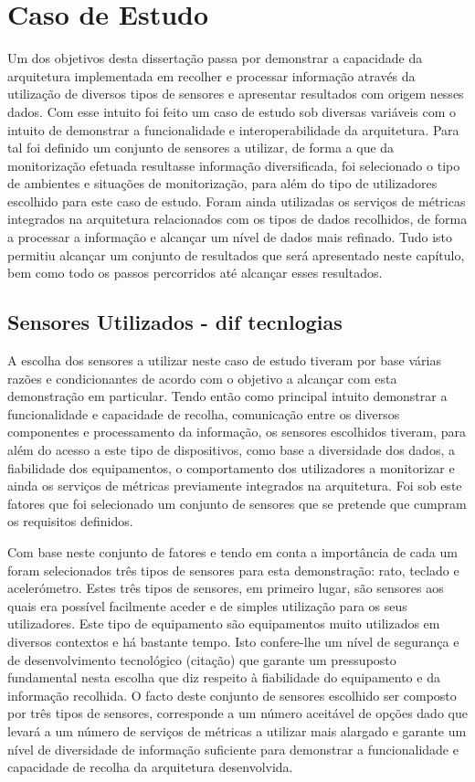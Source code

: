 \chapter{Caso de Estudo}

Um dos objetivos desta dissertação passa por demonstrar a capacidade da arquitetura implementada em recolher e processar informação através da utilização de diversos tipos de sensores e apresentar resultados com origem nesses dados. Com esse intuito foi feito um caso de estudo sob diversas variáveis com o intuito de demonstrar a funcionalidade e interoperabilidade da arquitetura. Para tal foi definido um conjunto de sensores a utilizar, de forma a que da monitorização efetuada resultasse informação diversificada, foi selecionado o tipo de ambientes e situações de monitorização, para além do tipo de utilizadores escolhido para este caso de estudo. Foram ainda utilizadas os serviços de métricas integrados na arquitetura relacionados com os tipos de dados recolhidos, de forma a processar a informação e alcançar um nível de dados mais refinado. Tudo isto permitiu alcançar um conjunto de resultados que será apresentado neste capítulo, bem como todo os passos percorridos até alcançar esses resultados.


\section{Sensores Utilizados - dif tecnlogias}

A escolha dos sensores a utilizar neste caso de estudo tiveram por base várias razões e condicionantes de acordo com o objetivo a alcançar com esta demonstração em particular. Tendo então como principal intuito demonstrar a funcionalidade e capacidade de recolha, comunicação entre os diversos componentes e processamento da informação, os sensores escolhidos tiveram, para além do acesso a este tipo de dispositivos, como base a diversidade dos dados, a fiabilidade dos equipamentos, o comportamento dos utilizadores a monitorizar e ainda os serviços de métricas previamente integrados na arquitetura. Foi sob este fatores que foi selecionado um conjunto de sensores que se pretende que cumpram os requisitos definidos.

Com base neste conjunto de fatores e tendo em conta a importância de cada um foram selecionados três tipos de sensores para esta demonstração: rato, teclado e acelerómetro. Estes três tipos de sensores, em primeiro lugar, são sensores aos quais era possível facilmente aceder e de simples utilização para os seus utilizadores. Este tipo de equipamento são equipamentos muito utilizados em diversos contextos e há bastante tempo. Isto confere-lhe um nível de segurança e de desenvolvimento tecnológico (citação) que garante um pressuposto fundamental nesta escolha que diz respeito à fiabilidade do equipamento e da informação recolhida. O facto deste conjunto de sensores escolhido ser composto por três tipos de sensores, corresponde a um número aceitável de opções dado que levará a um número de serviços de métricas a utilizar mais alargado e garante um nível de diversidade de informação suficiente para demonstrar a funcionalidade e capacidade de recolha da arquitetura desenvolvida.

